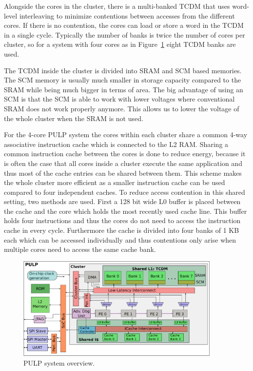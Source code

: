Alongside the cores in the cluster, there is a multi-banked \gls{TCDM} that
uses word-level interleaving to minimize contentions between accesses from the
different cores. If there is no contention, the cores can load or store a word
in the \gls{TCDM} in a single cycle. Typically the number of banks is twice the
number of cores per cluster, so for a system with four cores as in
Figure~\ref{fig:pulp_overview} eight \gls{TCDM} banks are used.

The \gls{TCDM} inside the cluster is divided into \gls{SRAM} and \gls{SCM} based
memories. The \gls{SCM} memory is usually much smaller in storage capacity
compared to the \gls{SRAM} while being much bigger in terms of area. The big
advantage of using an \gls{SCM} is that the \gls{SCM} is able to work with lower
voltages where conventional \gls{SRAM} does not work properly anymore. This
allows us to lower the voltage of the whole cluster when the \gls{SRAM} is not
used.

For the 4-core PULP system the cores within each cluster share a common 4-way
associative instruction cache which is connected to the L2 \gls{RAM}. Sharing a
common instruction cache between the cores is done to reduce energy, because it
is often the case that all cores inside a cluster execute the same application
and thus most of the cache entries can be shared between them. This scheme makes
the whole cluster more efficient as a smaller instruction cache can be used
compared to four independent caches. To reduce access contention in this shared
setting, two methods are used. First a 128 bit wide L0 buffer is placed between
the cache and the core which holds the most recently used cache line.  This
buffer holds four instructions and thus the cores do not need to access the
instruction cache in every cycle.
Furthermore the cache is divided into four banks of 1 KB each which can be
accessed individually and thus contentions only arise when multiple cores need
to access the same cache bank.

\begin{figure}[htbp]
  \centering \includegraphics[width=0.9\textwidth]{./figures/PULP}
  \caption{PULP system overview.}
  \label{fig:pulp_overview}
\end{figure}

